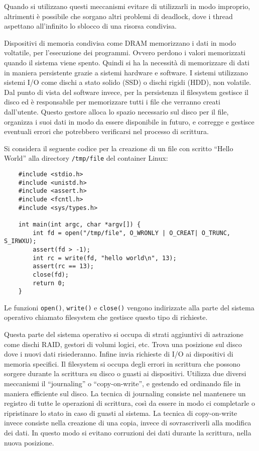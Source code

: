 \documentclass{article}
\numberwithin{equation}{subsection}
\begin{document}
Quando si utilizzano questi meccanismi evitare di utilizzarli in modo improprio, altrimenti è possibile che sorgano altri problemi di deadlock, dove i thread 
aspettano all'infinito lo sblocco di una risorsa condivisa. 


Dispositivi di memoria condivisa come DRAM memorizzano i dati in modo voltatile, per l'esecuzione dei programmi. Ovvero perdono i valori memorizzati quando il sistema 
viene spento. Quindi si ha la necessità di memorizzare di dati in maniera persistente grazie a sistemi hardware e software. I sistemi utilizzano sistemi I/O come 
dischi a stato solido (SSD) o dischi rigidi (HDD), non volatile. Dal punto di vista del software invece, per la persistenza il filesystem gestisce il disco ed è 
responsabile per memorizzare tutti i file che verranno creati dall'utente. Questo gestore alloca lo spazio necessario sul disco per il file, organizza i suoi dati in modo 
da essere disponibile in futuro, e corregge e gestisce eventuali errori che potrebbero verificarsi nel processo di scrittura. 

Si considera il seguente codice per la creazione di un file con scritto ``Hello World'' alla directory \verb|/tmp/file| del container Linux:
\begin{verbatim}
	#include <stdio.h>
	#include <unistd.h>
	#include <assert.h>
	#include <fcntl.h>
	#include <sys/types.h>

	int	main(int argc, char *argv[]) {
		int fd = open("/tmp/file", O_WRONLY | O_CREAT| O_TRUNC, S_IRWXU);
		assert(fd > -1);
		int rc = write(fd, "hello world\n", 13);
		assert(rc == 13);
		close(fd);
		return 0;
	}
\end{verbatim}


Le funzioni \verb|open()|, \verb|write()| e \verb|close()| vengono indirizzate alla parte del sistema operativo chiamato filesystem che gestisce questo tipo di richieste.  

Questa parte del sistema operativo si occupa di strati aggiuntivi di astrazione come dischi RAID, gestori di volumi logici, etc. Trova una posizione sul disco dove i nuovi 
dati risiederanno. Infine invia richieste di I/O ai dispositivi di memoria specifici. Il filesystem si occupa degli errori in scrittura che possono sorgere durante la 
scrittura su disco o guasti ai dispositivi. Utilizza due diversi meccanismi il ``journaling'' o ``copy-on-write'', e gestendo ed ordinando file in maniera efficiente sul 
disco. 
La tecnica di journaling consiste nel mantenere un registro di tutte le operazioni di scrittura, così da essere in modo ci completarle o ripristinare lo stato in caso 
di guasti al sistema. 
La tecnica di copy-on-write invece consiste nella creazione di una copia, invece di sovrascriverli alla modifica dei dati. In questo modo si evitano corruzioni dei dati 
durante la scrittura, nella nuova posizione. 
\end{document}
